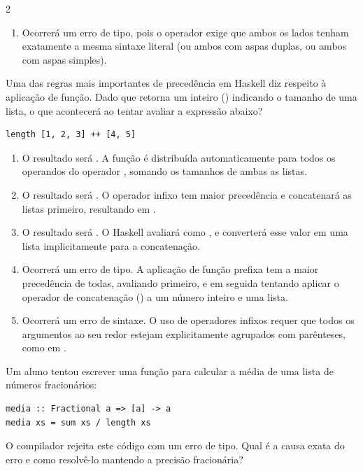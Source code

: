 \documentclass[a4paper,10pt,brazil]{article}
\begin{document}
\begin{multicols}{2}
\begin{enumerate}
  \item Ocorrerá um erro de tipo, pois o operador \haskellinline{++} exige que ambos os lados tenham exatamente a mesma sintaxe literal (ou ambos com aspas duplas, ou ambos com aspas simples).


\end{enumerate}

Uma das regras mais importantes de precedência em Haskell diz respeito à aplicação de função. Dado que  retorna um inteiro () indicando o tamanho de uma lista, o que acontecerá ao tentar avaliar a expressão abaixo?
\begin{verbatim}
length [1, 2, 3] ++ [4, 5]
\end{verbatim}

\begin{enumerate}
  \item O resultado será . A função  é distribuída automaticamente para todos os operandos do operador \haskellinline{++}, somando os tamanhos de ambas as listas.

  \item O resultado será . O operador infixo \haskellinline{++} tem maior precedência e concatenará as listas primeiro, resultando em .

  \item O resultado será \haskellinline{[3, 4, 5]}. O Haskell avaliará  como , e converterá esse valor em uma lista implicitamente para a concatenação.

  \item Ocorrerá um erro de tipo. A aplicação de função prefixa tem a maior precedência de todas, avaliando  primeiro, e em seguida tentando aplicar o operador de concatenação (\haskellinline{++}) a um número inteiro e uma lista.

  \item Ocorrerá um erro de sintaxe. O uso de operadores infixos requer que todos os argumentos ao seu redor estejam explicitamente agrupados com parênteses, como em .


\end{enumerate}

Um aluno tentou escrever uma função para calcular a média de uma lista de números fracionários:
\begin{verbatim}
media :: Fractional a => [a] -> a
media xs = sum xs / length xs
\end{verbatim}
O compilador rejeita este código com um erro de tipo. Qual é a causa exata do erro e como resolvê-lo mantendo a precisão fracionária?


\end{multicols}
\end{document}
